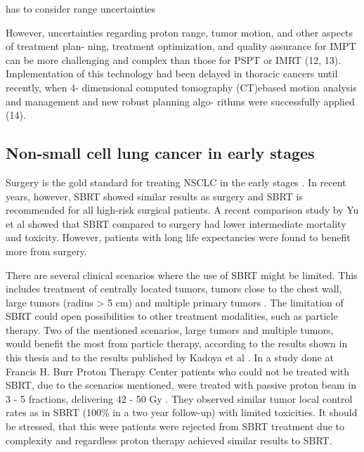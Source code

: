 \documentclass[type=dr, dr=rernat, accentcolor=tud7b,colorbacktitle, bigchapter, openright, twoside, 12pt ]{tudthesis}
\begin{document}
has to consider range uncertainties

However, uncertainties regarding proton
range, tumor motion, and other aspects of treatment plan-
ning, treatment optimization, and quality assurance for
IMPT can be more challenging and complex than those for
PSPT or IMRT (12, 13). Implementation of this technology
had been delayed in thoracic cancers until recently, when 4-
dimensional computed tomography (CT)ebased motion
analysis and management and new robust planning algo-
rithms were successfully applied (14).




\subsection{Non-small cell lung cancer in early stages}

Surgery is the gold standard for treating NSCLC in the early stages \cite{Roesch2014}. 
In recent years, however, SBRT showed similar results as surgery and SBRT is recommended for all high-risk surgical patients. A recent comparison study by Yu et al \cite{Yu2015} showed that
SBRT compared to surgery had lower intermediate mortality and toxicity. However, patients with long life expectancies were found to benefit more from surgery. 

There are several clinical scenarios where the use of SBRT might be limited. 
This includes treatment of centrally located tumors, tumors close to the chest wall, large tumors (radius > 5 cm) and 
multiple primary tumors \cite{Timmerman2006, Georg2008, Westover2012}.
The limitation of SBRT could open possibilities to other treatment modalities, such as particle therapy. 
Two of the mentioned scenarios, large tumors and multiple tumors, would benefit the most from particle therapy, according to the results shown
in this thesis and to the results published by Kadoya et al \cite{Kadoya2010}. In a study done at Francis H. Burr Proton Therapy Center 
patients who could not be treated with SBRT, due to the scenarios mentioned, were treated with passive proton beam in 3 - 5 fractions, 
delivering 42 - 50 Gy \cite{Westover2012}. They observed similar tumor local control rates as in SBRT (100\% in a two year follow-up) with limited toxicities. 
It should be stressed, that this were patients were rejected from SBRT treatment due to complexity and regardless proton therapy achieved similar results
to SBRT.
\end{document}
